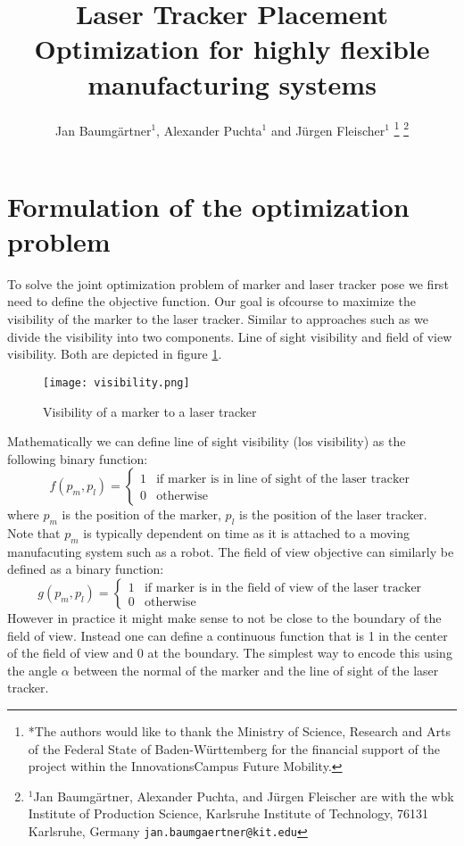 \documentclass{svproc}
\title{\LARGE \bf
Laser Tracker Placement Optimization for highly flexible manufacturing systems
}
\author{Jan Baumgärtner$^{1}$,  Alexander Puchta$^{1}$ and Jürgen Fleischer$^{1}$%
\thanks{*The authors would like to thank the Ministry of Science, Research and Arts of the Federal State of Baden-Württemberg for the financial support of the project within the InnovationsCampus Future Mobility.
}%
\thanks{$^{1}$Jan Baumgärtner, Alexander Puchta, and Jürgen Fleischer are with the wbk Institute of Production Science,
        Karlsruhe Institute of Technology, 76131 Karlsruhe, Germany
        {\tt\small jan.baumgaertner@kit.edu}}%
}
\begin{document}
\maketitle
\thispagestyle{empty}
\pagestyle{empty}


\section{Formulation of the optimization problem}
To solve the joint optimization problem of marker and laser tracker pose we first need to define the objective function.
Our goal is ofcourse to maximize the visibility of the marker to the laser tracker.
Similar to approaches such as \cite{ieee_sensors} we divide the visibility into two components.
Line of sight visibility and field of view visibility.
Both  are depicted in figure \ref{fig:visibility}.
\begin{figure}
        \centering
        \texttt{[image: visibility.png]}
        \caption{Visibility of a marker to a laser tracker}
        \label{fig:visibility}
\end{figure}
Mathematically we can define line of sight visibility (los visibility) as the following binary function:
\begin{equation}
    f(p_m,p_l) = \begin{cases}
    1 & \text{if } \text{marker is in line of sight of the laser tracker} \\
    0 & \text{otherwise}
    \end{cases}
\end{equation}
where $p_m$ is the position of the marker, $p_l$ is the position of the laser tracker.
Note that $p_m$ is typically dependent on time as it is attached to a moving manufacuting system such as a robot.
The field of view objective can similarly be defined as a binary function:
\begin{equation}
    g(p_m,p_l) = \begin{cases}
    1 & \text{if } \text{marker is in the field of view of the laser tracker} \\
    0 & \text{otherwise}
    \end{cases}
\end{equation}
However in practice it might make sense to not be close to the boundary of the field of view.
Instead one can define a continuous function that is 1 in the center of the field of view and 0 at the boundary.
The simplest way to encode this using the angle $\alpha$ between the normal of the marker and the line of sight of the laser tracker.
\end{document}
